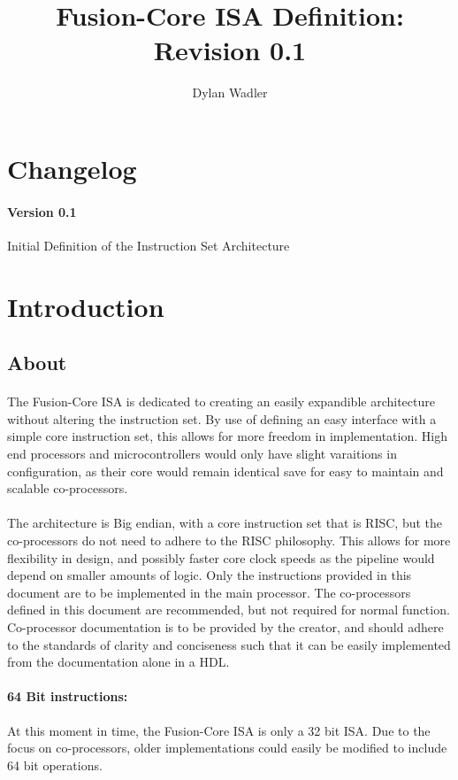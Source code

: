 \documentclass[letterpaper, 11pt]{article}
\title{Fusion-Core ISA Definition: Revision 0.1}
\author{Dylan Wadler}
\begin{document}
\maketitle
\newpage
\tableofcontents


\newpage
\section{Changelog}
\paragraph{Version 0.1} Initial Definition of the Instruction Set Architecture

\section{Introduction}

\subsection{About}
\paragraph{}The Fusion-Core ISA is dedicated to creating an easily expandible architecture without altering
the instruction set. By use of defining an easy interface with a simple core instruction set, this allows for
more freedom in implementation. High end processors and microcontrollers would only have slight varaitions in
configuration, as their core would remain identical save for easy to maintain and scalable co-processors.
\paragraph{}The architecture is Big endian, with a core instruction set that is RISC, but the co-processors do not need to adhere to the RISC philosophy. This allows for more flexibility in design, and possibly faster core clock speeds as the pipeline would depend on smaller amounts of logic. Only the instructions provided in this document are to be implemented in the main processor. The co-processors defined in this document are recommended, but not required for normal function. Co-processor documentation is to be provided by the creator, and should adhere to the standards of clarity and conciseness such that it can be easily implemented from the documentation alone in a HDL. 
\paragraph{64 Bit instructions:}At this moment in time, the Fusion-Core ISA is only a 32 bit ISA. Due to the focus on co-processors,
older implementations could easily be modified to include 64 bit operations.
\end{document}
